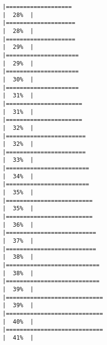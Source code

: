 \documentclass[
]{book}
\begin{document}
\begin{verbatim}
|===================                                                   |  28%  |                                                                              |====================                                                  |  28%  |                                                                              |====================                                                  |  29%  |                                                                              |=====================                                                 |  29%  |                                                                              |=====================                                                 |  30%  |                                                                              |=====================                                                 |  31%  |                                                                              |======================                                                |  31%  |                                                                              |======================                                                |  32%  |                                                                              |=======================                                               |  32%  |                                                                              |=======================                                               |  33%  |                                                                              |========================                                              |  34%  |                                                                              |========================                                              |  35%  |                                                                              |=========================                                             |  35%  |                                                                              |=========================                                             |  36%  |                                                                              |==========================                                            |  37%  |                                                                              |==========================                                            |  38%  |                                                                              |===========================                                           |  38%  |                                                                              |===========================                                           |  39%  |                                                                              |============================                                          |  39%  |                                                                              |============================                                          |  40%  |                                                                              |============================                                          |  41%  |                                                                              
\end{verbatim}
\end{document}
